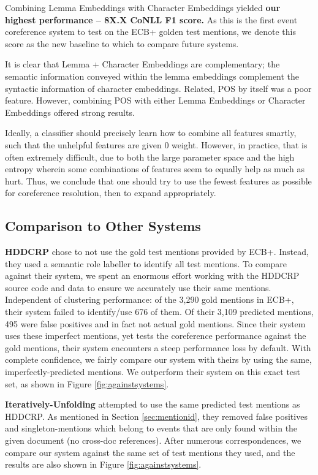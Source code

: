 \documentclass[11pt,a4paper]{article}
\begin{document}
Combining Lemma Embeddings with Character Embeddings yielded \textbf{our highest performance -- 8X.X CoNLL F1 score.}  As this is the first event coreference system to test on the ECB+ golden test mentions, we denote this score as the new baseline to which to compare future systems.

It is clear that Lemma + Character Embeddings are complementary; the semantic information conveyed within the lemma embeddings complement the syntactic information of character embeddings.  Related, POS by itself was a poor feature.  However, combining POS with either Lemma Embeddings or Character Embeddings offered strong results. 

Ideally, a classifier should precisely learn how to combine all features smartly, such that the unhelpful features are given 0 weight.  However, in practice, that is often extremely difficult, due to both the large parameter space and the high entropy wherein some combinations of features seem to equally help as much as hurt.  Thus, we conclude that one should try to use the fewest features as possible for coreference resolution, then to expand appropriately.

\subsection{Comparison to Other Systems}
\textbf{HDDCRP} chose to not use the gold test mentions provided by ECB+.  Instead, they used a semantic role labeller to identify all test mentions.
To compare against their system, we spent an enormous effort working with the HDDCRP source code and data to ensure we accurately use their same mentions.  Independent of clustering performance: of the 3,290 gold mentions in ECB+, their system failed to identify/use 676 of them.  Of their 3,109 predicted mentions, 495 were false positives and in fact not actual gold mentions.  Since their system uses these imperfect mentions, yet tests the coreference performance against the gold mentions, their system encounters a steep performance loss by default.  With complete confidence, we fairly compare our system with theirs by using the same, imperfectly-predicted mentions.  We outperform their system on this exact test set, as shown in Figure \ref{fig:againstsystems}.

\textbf{Iteratively-Unfolding} attempted to use the same predicted test mentions as HDDCRP.  As mentioned in Section \ref{sec:mentionid}, they removed false positives and singleton-mentions which belong to events that are only found within the given document (no cross-doc references).  After numerous correspondences, we compare our system against the same set of test mentions they used, and the results are also shown in Figure \ref{fig:againstsystems}.
\end{document}
